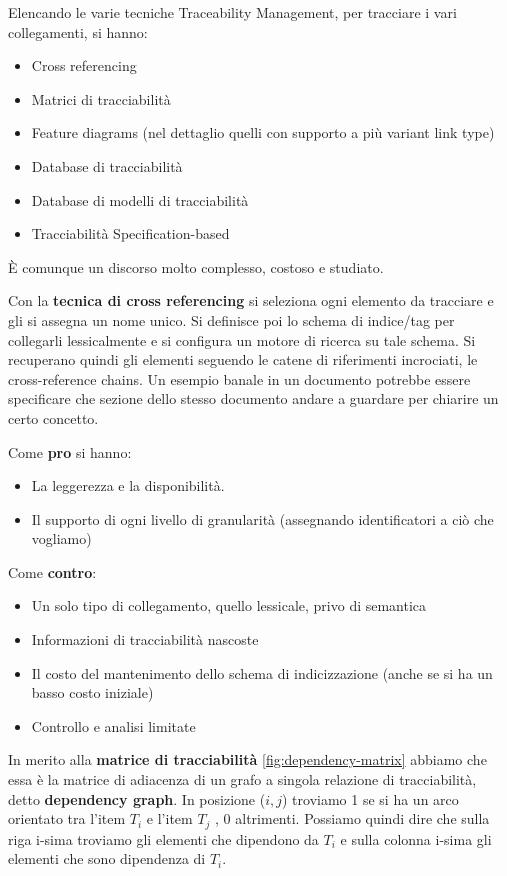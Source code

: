 Elencando le varie tecniche Traceability Management, per tracciare i vari
collegamenti, si hanno:
\begin{itemize}
      \item Cross referencing
      \item Matrici di tracciabilità
      \item Feature diagrams (nel dettaglio quelli con supporto a più variant link
            type)
      \item Database di tracciabilità
      \item Database di modelli di tracciabilità
      \item Tracciabilità Specification-based
\end{itemize}
È comunque un discorso molto complesso, costoso e studiato.

Con la \textbf{tecnica di cross referencing} si seleziona ogni elemento da tracciare e
gli si assegna un nome unico. Si definisce poi lo schema di indice/tag per
collegarli lessicalmente e si configura un motore di ricerca su tale schema.
Si recuperano quindi gli elementi seguendo le catene di riferimenti incrociati,
le cross-reference chains. Un esempio banale in un documento potrebbe essere
specificare che sezione dello stesso documento andare a guardare per chiarire un
certo concetto.

Come \textbf{pro} si hanno:
\begin{itemize}
      \item La leggerezza e la disponibilità.
      \item Il supporto di ogni livello di granularità (assegnando identificatori
            a ciò che vogliamo)
\end{itemize}
Come \textbf{contro}:
\begin{itemize}
      \item Un solo tipo di collegamento, quello lessicale, privo di semantica
      \item Informazioni di tracciabilità nascoste
      \item Il costo del mantenimento dello schema di indicizzazione (anche se si ha
            un basso costo iniziale)
      \item Controllo e analisi limitate
\end{itemize}
In merito alla \textbf{matrice di tracciabilità} \ref{fig:dependency-matrix}
abbiamo che essa è la matrice di adiacenza di un grafo a singola relazione di
tracciabilità, detto \textbf{dependency graph}. In posizione ($i,j$) troviamo 1
se si ha un arco orientato tra l'item $T_i$ e l'item $T_j$ , 0 altrimenti.
Possiamo quindi dire che sulla riga i-sima troviamo gli elementi che dipendono
da $T_i$ e sulla colonna i-sima gli elementi che sono dipendenza di $T_i$.

